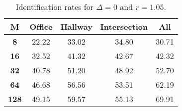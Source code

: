 \begin{table}[h]
    \footnotesize
    \centering
    \begin{tabular}{|c|c|c|c|l|}    
    \hline
    {\bf M} & {\bf Office} & {\bf Hallway} & {\bf Intersection} &     \multicolumn{1}{c|}{{\bf All}} \\ \hline
    {\bf 8} & 22.22 & 33.02 & 34.80 & 30.71 \\ \hline
    {\bf 16} & 32.52 & 41.32 & 42.67 & 42.32 \\ \hline
    {\bf 32} & 40.78 & 51.20 & 48.92 & 52.70 \\ \hline
    {\bf 64} & 46.68 & 56.56 & 53.51 & 62.19 \\ \hline
    {\bf 128} & 49.15 & 59.57 & 55.13 & 69.91 \\ \hline
    \end{tabular}
    \caption{Identification rates for $\Delta = 0$ and $r = 1.05$.}    
    \label{tab:identify_speakers_1.05_mit_19_0}
\end{table}
